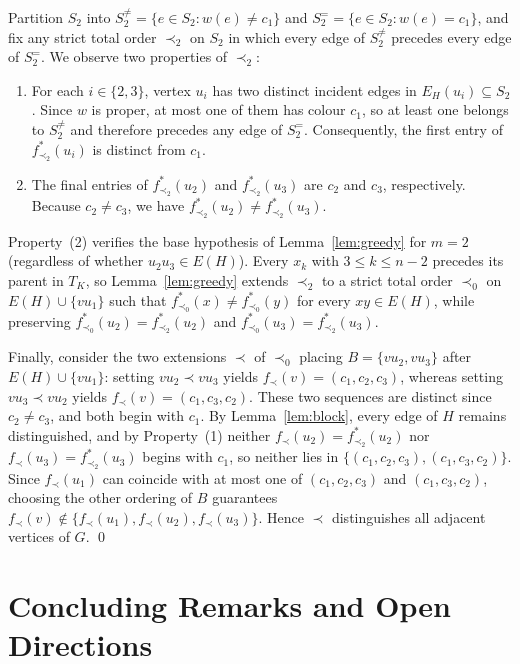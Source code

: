\documentclass[11pt,a4paper]{article}
\begin{document}
Partition $S_2$ into $S_2^{\neq} = \{e \in S_2 : w(e) \neq c_1\}$ and $S_2^{=} = \{e \in S_2 : w(e) = c_1\}$, and fix any strict total order $\prec_2$ on $S_2$ in which every edge of $S_2^{\neq}$ precedes every edge of $S_2^{=}$. We observe two properties of $\prec_2$:
\begin{enumerate}
  \item For each $i \in \{2, 3\}$, vertex $u_i$ has two distinct incident edges in $E_H(u_i) \subseteq S_2$. Since $w$ is proper, at most one of them has colour $c_1$, so at least one belongs to $S_2^{\neq}$ and therefore precedes any edge of $S_2^{=}$. Consequently, the first entry of $f^*_{\prec_2}(u_i)$ is distinct from $c_1$.
  \item The final entries of $f^*_{\prec_2}(u_2)$ and $f^*_{\prec_2}(u_3)$ are $c_2$ and $c_3$, respectively. Because $c_2 \neq c_3$, we have $f^*_{\prec_2}(u_2) \neq f^*_{\prec_2}(u_3)$.
\end{enumerate}
Property~(2) verifies the base hypothesis of Lemma~\ref{lem:greedy} for $m = 2$ (regardless of whether $u_2 u_3 \in E(H)$). Every $x_k$ with $3 \le k \le n - 2$ precedes its parent in $T_K$, so Lemma~\ref{lem:greedy} extends $\prec_2$ to a strict total order $\prec_0$ on $E(H) \cup \{v u_1\}$ such that $f^*_{\prec_0}(x) \neq f^*_{\prec_0}(y)$ for every $xy \in E(H)$, while preserving $f^*_{\prec_0}(u_2) = f^*_{\prec_2}(u_2)$ and $f^*_{\prec_0}(u_3) = f^*_{\prec_2}(u_3)$.

Finally, consider the two extensions $\prec$ of $\prec_0$ placing $B = \{v u_2, v u_3\}$ after $E(H) \cup \{v u_1\}$: setting $v u_2 \prec v u_3$ yields $f_\prec(v) = (c_1, c_2, c_3)$, whereas setting $v u_3 \prec v u_2$ yields $f_\prec(v) = (c_1, c_3, c_2)$. These two sequences are distinct since $c_2 \neq c_3$, and both begin with $c_1$. By Lemma~\ref{lem:block}, every edge of $H$ remains distinguished, and by Property~(1) neither $f_\prec(u_2) = f^*_{\prec_2}(u_2)$ nor $f_\prec(u_3) = f^*_{\prec_2}(u_3)$ begins with $c_1$, so neither lies in $\{(c_1, c_2, c_3), (c_1, c_3, c_2)\}$. Since $f_\prec(u_1)$ can coincide with at most one of $(c_1, c_2, c_3)$ and $(c_1, c_3, c_2)$, choosing the other ordering of $B$ guarantees $f_\prec(v) \notin \{f_\prec(u_1), f_\prec(u_2), f_\prec(u_3)\}$. Hence $\prec$ distinguishes all adjacent vertices of $G$. \qed

\section{Concluding Remarks and Open Directions}
\end{document}

